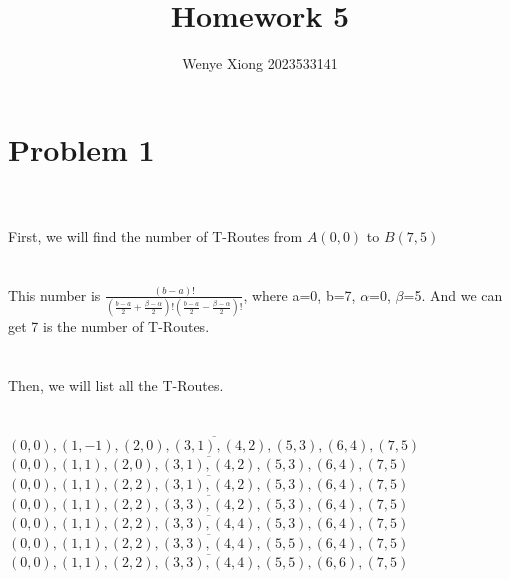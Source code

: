 \documentclass{article}
\author{Wenye Xiong 2023533141}
\title{Homework 5}
\begin{document}
\maketitle
\section{Problem 1}
\\ \hspace*{\fill} \\
First, we will find the number of T-Routes from $A(0,0)$ to $B(7,5)$\\
\\ \hspace*{\fill} \\
This number is $\frac{(b-a)!}{(\frac{b-a}{2} + \frac{\beta - \alpha}{2})! (\frac{b-a}{2} - \frac{\beta - \alpha}{2})!}$, where a=0, b=7, $\alpha$=0, $\beta$=5. And we can get 7 is the number of T-Routes.\\
\\ \hspace*{\fill} \\
Then, we will list all the T-Routes.\\
\\ \hspace*{\fill} \\
$\overline{(0,0),(1,-1),(2,0),(3,1),(4,2),(5,3),(6,4),(7,5)}$ \ $\overline{(0,0),(1,1),(2,0),(3,1),(4,2),(5,3),(6,4),(7,5)}$ \ $\overline{(0,0),(1,1),(2,2),(3,1),(4,2),(5,3),(6,4),(7,5)}$ \ $\overline{(0,0),(1,1),(2,2),(3,3),(4,2),(5,3),(6,4),(7,5)}$ \ $\overline{(0,0),(1,1),(2,2),(3,3),(4,4),(5,3),(6,4),(7,5)}$ \ $\overline{(0,0),(1,1),(2,2),(3,3),(4,4),(5,5),(6,4),(7,5)}$ \ $\overline{(0,0),(1,1),(2,2),(3,3),(4,4),(5,5),(6,6),(7,5)}$ \ \\
\\ \hspace*{\fill} \\
\newpage
\end{document}
